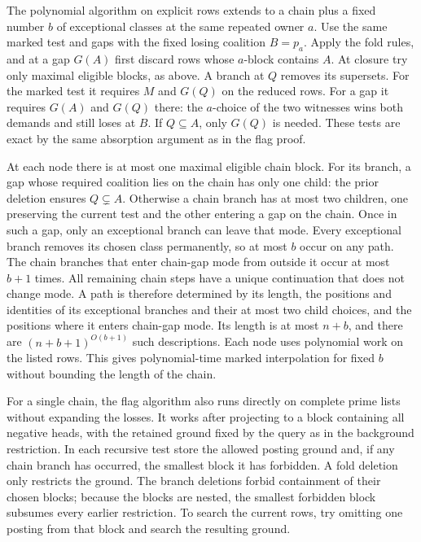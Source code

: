 The polynomial algorithm on explicit rows extends
to a chain plus a fixed number $b$ of exceptional
classes at the same repeated owner $a$. Use the
same marked test and gaps with the fixed losing
coalition $B=p_a$. Apply the fold rules, and at a
gap $G(A)$ first discard rows whose $a$-block
contains $A$. At closure try only maximal eligible
blocks, as above. A branch at $Q$ removes its
supersets. For the marked test it requires $M$
and $G(Q)$ on the reduced rows. For a gap it
requires $G(A)$ and $G(Q)$ there: the $a$-choice
of the two witnesses wins both demands and still
loses at $B$. If $Q\subseteq A$, only $G(Q)$ is
needed. These tests are exact by the same
absorption argument as in the flag proof.

At each node there is at most one maximal eligible
chain block. For its branch, a gap whose required
coalition lies on the chain has only one child:
the prior deletion ensures $Q\subsetneq A$.
Otherwise a chain branch has at most two children,
one preserving the current test and the other
entering a gap on the chain. Once in such a gap,
only an exceptional branch can leave that mode.
Every exceptional branch removes its chosen
class permanently, so at most $b$ occur on any
path. The chain branches that enter chain-gap
mode from outside it occur at most $b+1$ times.
All remaining chain steps have a unique
continuation that does not change mode. A path
is therefore determined by its length, the
positions and identities of its exceptional
branches and their at most two child choices,
and the positions where it enters chain-gap
mode. Its length is at most $n+b$, and there
are $(n+b+1)^{O(b+1)}$ such descriptions.
Each node uses polynomial work on the listed
rows. This gives polynomial-time marked
interpolation for fixed $b$ without bounding
the length of the chain.

For a single chain, the flag algorithm also runs
directly on complete prime lists without expanding
the losses. It works after projecting to a block
containing all negative heads, with the retained
ground fixed by the query as in the background
restriction. In each recursive test store the allowed
posting ground and, if any chain branch has occurred,
the smallest block it has forbidden. A fold deletion
only restricts the ground. The branch deletions forbid
containment of their chosen blocks; because the
blocks are nested, the smallest forbidden block
subsumes every earlier restriction. To search the
current rows, try omitting one posting from that
block and search the resulting ground.

